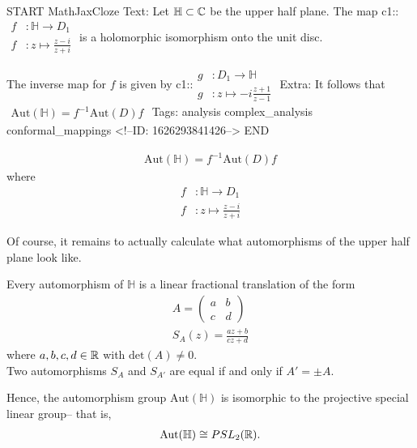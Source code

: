 \documentclass{memoir}
\begin{document}
\begin{anki}
START
MathJaxCloze
Text: 
Let \(\mathbb{H}\subset \mathbb{C}\) be the upper half plane. The map
 {{c1::\(\begin{align*}
        	f&:\mathbb{H} \to D_1\\
        	f&:z \mapsto \frac{z-i}{z+i}
        \end{align*}\)}} 
is a holomorphic isomorphism onto the unit disc.

The inverse map for \(f\) is given by
 {{c1::\(\begin{align*}
        	g&:D_1 \to \mathbb{H}\\
        	g&:z\mapsto -i\frac{z+1}{z-1}
        \end{align*}\)}}
Extra: It follows that
\(\begin{align*}
  	\textrm{Aut}(\mathbb{H}) = f^{-1} \textrm{Aut}(D) f
  \end{align*}\)
Tags: analysis complex_analysis conformal_mappings
<!--ID: 1626293841426-->
END
\end{anki}


\begin{cor}
	\begin{align*}
		\textrm{Aut}(\mathbb{H}) = f^{-1} \textrm{Aut}(D) f
	\end{align*}
	where
	\begin{align*}
		f&:\mathbb{H} \to D_1\\
		f&:z \mapsto \frac{z-i}{z+i}
	\end{align*}
\end{cor}
Of course, it remains to actually calculate what automorphisms of the upper half plane look like.

\begin{thm}
	Every automorphism of \(\mathbb{H}\) is a linear fractional translation of the form
	\begin{align*}
		A = \begin{pmatrix} a & b \\ c & d \end{pmatrix} \\
		S_A(z) =\frac{az+b}{c z + d}
	\end{align*}
	where \(a,b,c,d \in \mathbb{R}\) with \(\textrm{det}(A)\neq 0\).\\

	Two automorphisms \(S_A\) and \(S_{A'}\) are equal if and only if \(A' = \pm A\).
\end{thm}
Hence, the automorphism group \(\textrm{Aut}(\mathbb{H})\) is isomorphic to the projective special linear group-- that is,
 \begin{align*}
	 \textrm{Aut}(\mathbb{H}) \cong PSL_2(\mathbb{R}).
\end{align*}
\end{document}
